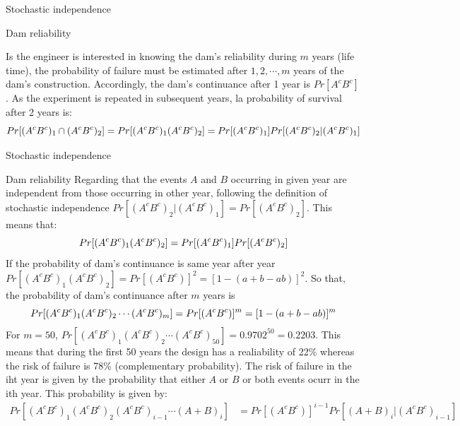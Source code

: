 \documentclass[8pt]{beamer}
\begin{document}
\begin{frame}{Stochastic independence}
\begin{exampleblock}{Dam reliability}
\begin{minipage}{0.3\textwidth}
        \end{minipage}
        Is the engineer is interested in knowing the dam's reliability during $m$ years (life time), the probability of failure must be estimated after $1, 2, \cdots, m$ years of the dam's construction. Accordingly, the dam's continuance after 1 year is $Pr[A^c B^c]$. As the experiment is repeated in subsequent years, la probability of survival after 2 years is: 
        \vspace{-5pt}
        $$
        Pr[(A^c B^c)_1 \cap (A^c B^c)_2] = Pr[(A^c B^c)_1 (A^c B^c)_2] = Pr[(A^c B^c)_1] Pr[(A^c B^c)_2 |  (A^c B^c)_1]
        \vspace{-5pt}
        $$
\end{exampleblock}
\end{frame}

\begin{frame}{Stochastic independence}
    \begin{exampleblock}{Dam reliability}
        Regarding that the events $A$ and $B$ occurring in given year are independent from those occurring in other year, following the definition of stochastic independence $Pr[(A^c B^c)_2 |  (A^c B^c)_1] = Pr[(A^c B^c)_2]$. This means that:
        \vspace{-5pt}
        $$
        Pr[(A^c B^c)_1 (A^c B^c)_2] = Pr[(A^c B^c)_1] Pr[(A^c B^c)_2]
        \vspace{-5pt}
        $$
        If the probability of dam's continuance is same year after year $Pr[(A^c B^c)_1 (A^c B^c)_2] = Pr[(A^c B^c)]^2 = [1 - (a + b - ab)]^2$. So that, the probability of dam's continuance after $m$ years is
        \vspace{-5pt}
$$
        Pr[(A^c B^c)_1 (A^c B^c)_2 \cdots (A^c B^c)_m] = Pr[(A^c B^c)]^m = [1 - (a + b - ab)]^m
        \vspace{-5pt}
        $$
        For $m = 50$, $Pr[(A^c B^c)_1 (A^c B^c)_2 \cdots (A^c B^c)_{50}] = 0.9702^{50} = 0.2203 $. This means that during the first 50 years the design has a realiability of 22\% whereas the risk of failure is 78\% (complementary probability). The risk of failure in the iht year is given by the probability that either $A$ or $B$ or both events ocurr in the ith year. This probability is given by:
        \vspace{-5pt}
        \begin{align*}
            Pr[(A^c B^c)_1 (A^c B^c)_2 (A^c B^c)_{i-1} \cdots (A + B)_i ] &= Pr[(A^c B^c)]^{i-1} Pr[(A + B)_i | (A^c B^c)_{i-1}] \\

\end{align*}
\end{exampleblock}
\end{frame}
\end{document}

